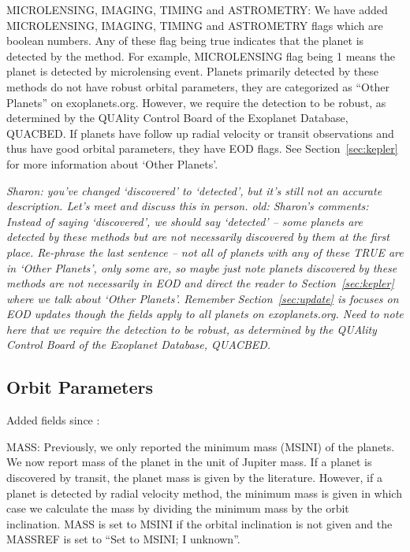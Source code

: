 \documentclass[11pt,preprint]{aastex}
\begin{document}
\begin{CJK*}{UTF8}{gbsn}
MICROLENSING, IMAGING, TIMING and ASTROMETRY: We have added MICROLENSING, IMAGING, TIMING and ASTROMETRY flags which are boolean numbers. Any of these flag being true indicates that the planet is detected by the method. For example, MICROLENSING flag being 1 means the planet is detected by microlensing event. Planets primarily detected
by these methods do not have robust orbital parameters, they are
categorized as ``Other Planets'' on exoplanets.org. However, we require the detection to be robust, as determined by the QUAlity Control Board of the Exoplanet Database, QUACBED. 
If planets have follow up radial velocity or transit observations and
thus have good orbital parameters, they have EOD flags. See
Section~\ref{sec:kepler} for more information about `Other Planets'. 

\textit {Sharon: you've changed `discovered' to `detected', but it's
  still not an accurate description. Let's meet and discuss this in
  person. 
  old: Sharon's
  comments: Instead of saying `discovered', we should say `detected'
  -- some planets are detected by these methods but are not
  necessarily discovered by them at the first place. Re-phrase the
  last sentence -- not all of planets with any of these TRUE are in
  `Other Planets', only some are, so maybe just note planets
  discovered by these methods are not necessarily in EOD and direct
  the reader to Section~\ref{sec:kepler} where we talk about `Other
  Planets'. Remember Section~\ref{sec:update} is focuses on EOD
  updates though the fields apply to all planets on
  exoplanets.org. Need to note here that we require the detection to
  be robust, as determined by the QUAlity Control Board of the
  Exoplanet Database, QUACBED.}


\subsection{Orbit Parameters}

Added fields since \cite{Wright2011}:


MASS: Previously, we only reported the minimum mass (MSINI) of the
planets. We now report mass of the planet in the unit of Jupiter
mass. If a planet is discovered by transit, the planet mass is given
by the literature. However, if a planet is detected by radial velocity
method, the minimum mass is given in which case we calculate the mass
by dividing the minimum mass by the orbit inclination. MASS is set to
MSINI if the orbital inclination is not given and the MASSREF is set
to ``Set to MSINI; I unknown''. 


\end{CJK*}
\end{document}
